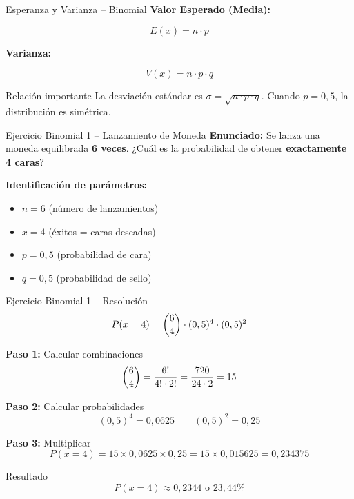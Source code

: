 \documentclass[10pt]{beamer}
\begin{document}
\begin{frame}{Esperanza y Varianza -- Binomial}
\justifying
\textbf{Valor Esperado (Media):}
\begin{center}
\Large
\[
E(x) = n \cdot p
\]
\end{center}

\vspace{0.3cm}
\justifying
\textbf{Varianza:}
\begin{center}
\Large
\[
V(x) = n \cdot p \cdot q
\]
\end{center}

\vspace{0.3cm}
\begin{alertblock}{Relación importante}
La desviación estándar es $\sigma = \sqrt{n \cdot p \cdot q}$. Cuando $p = 0,5$, la distribución es simétrica.
\end{alertblock}
\end{frame}

\begin{frame}{Ejercicio Binomial 1 -- Lanzamiento de Moneda}
\textbf{Enunciado:}
\justifying
Se lanza una moneda equilibrada \textbf{6 veces}. ¿Cuál es la probabilidad de obtener \textbf{exactamente 4 caras}?

\vspace{0.2cm}
\textbf{Identificación de parámetros:}
\begin{itemize}
    \item $n = 6$ (número de lanzamientos)
    \item $x = 4$ (éxitos = caras deseadas)
    \item $p = 0,5$ (probabilidad de cara)
    \item $q = 0,5$ (probabilidad de sello)
\end{itemize}
\end{frame}

\begin{frame}{Ejercicio Binomial 1 -- Resolución}
\[
P(x=4) = \dbinom{6}{4} \cdot (0,5)^{4} \cdot (0,5)^{2}
\]

\textbf{Paso 1:} Calcular combinaciones
\[
\dbinom{6}{4} = \frac{6!}{4! \cdot 2!} = \frac{720}{24 \cdot 2} = 15
\]

\textbf{Paso 2:} Calcular probabilidades
\[
(0,5)^{4} = 0,0625 \qquad (0,5)^{2} = 0,25
\]

\textbf{Paso 3:} Multiplicar
\[
P(x=4) = 15 \times 0,0625 \times 0,25 = 15 \times 0,015625 = 0,234375
\]

\begin{block}{Resultado}
\[
\boxed{P(x=4) \approx 0,2344 \text{ o } 23,44\%}
\]
\end{block}
\end{frame}
\end{document}
